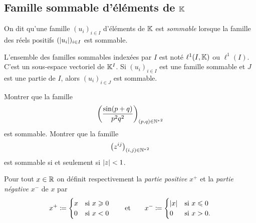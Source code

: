 \documentclass{magnolia}
\begin{document}






\subsection{Famille sommable d'éléments de $\mathbb{K}$}

\begin{definition}
On dit qu'une famille $(u_i)_{i\in I}$ d'éléments de $\mathbb{K}$ est \emph{sommable} lorsque
la famille des réels positifs $(\left|u_i\right|)_{i\in I}$ est sommable.
\end{definition}

\begin{remarques}
\remarque L'ensemble des familles sommables indexées par $I$ est noté $\ell^1(I,\mathbb{K})$
  ou $\ell^1(I)$.
  C'est un sous-espace vectoriel de $\mathbb{K}^I$.
\remarque Si $(u_i)_{i\in I}$ est une famille sommable et $J$ est une partie de $I$, alors $(u_i)_{i\in J}$ est sommable.
\end{remarques}

\begin{exos}
\exo Montrer que la famille
  \[\left(\frac{\sin(p+q)}{p^2 q^2}\right)_{(p,q)\in{\mathbb{N}^*}^2}\]
  est sommable.
\exo Montrer que la famille
  \[\left(z^{ij}\right)_{(i,j)\in{\mathbb{N}^*}^2}\]
  est sommable si et seulement si $\left|z\right|<1$.
\end{exos}

\begin{definition}
Pour tout $x\in\mathbb{R}$ on définit respectivement la \emph{partie positive} $x^+$ 
et la \emph{partie négative} $x^-$ de $x$ par
\[x^+\coloneqq
  \begin{cases}
  x & \text{si $x\geqslant 0$}\\
  0 & \text{si $x<0$}
  \end{cases}
  \qquad \text{et} \qquad
  x^-\coloneqq
  \begin{cases}
  \left|x\right| & \text{si $x\leqslant 0$}\\
  0 & \text{si $x>0$.}
  \end{cases}\]
\end{definition}
\end{document}
